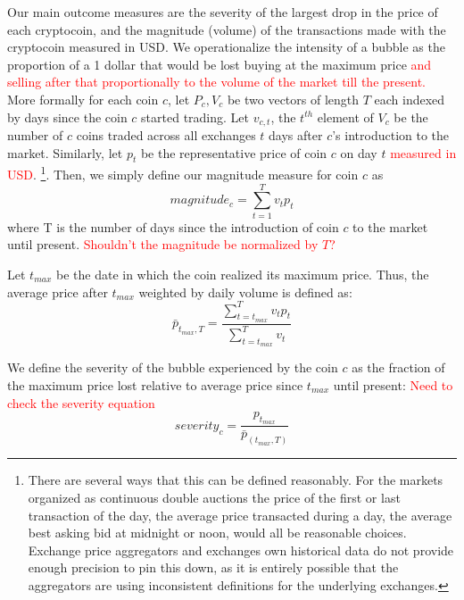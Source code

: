 Our main outcome measures are the severity of the largest drop in the price of each cryptocoin, and the magnitude (volume) of the transactions made with the cryptocoin measured in USD.
We operationalize the intensity of a bubble as the proportion of a 1 dollar that would be lost buying at the maximum price \textcolor{red}{and selling after that proportionally to the volume of the market till the present.}
More formally for each coin $c$, let $P_c,V_c$ be two vectors of length $T$ each indexed by days since the coin $c$ started trading.
Let $v_{c,t}$, the $t^{th}$ element of $V_c$ be the number of $c$ coins traded across all exchanges $t$ days after $c$'s introduction to the market. 
Similarly, let $p_t$ be the representative price of coin $c$ on day $t$ \textcolor{red}{measured in USD}. \footnote{There are several ways that this can be defined reasonably. For the markets organized as continuous double auctions the price of the first or last transaction of the day,  the average price transacted during a day, the average best asking bid at midnight or noon, would all be reasonable choices. Exchange price aggregators and exchanges own historical data do not provide enough precision to pin this down, as it is entirely possible that the aggregators are using inconsistent definitions for the underlying exchanges.}. Then, we simply define our magnitude measure for coin $c$ as
\begin{equation}
magnitude_{c} = \sum_{t=1}^{T} v_t  p_t
\end{equation}
where T is the number of days since the introduction of coin $c$ to the market until present. \textcolor{red}{Shouldn't the magnitude be normalized by $T$?}


Let $t_{max}$ be the date in which the coin realized its maximum price. Thus, the average price after $t_{max}$ weighted by daily volume is defined as:
\begin{equation}
\bar{p}_{t_{max},T} = \frac{\sum_{t=t_{max}}^{T} v_t p_t} {\sum_{t=t_{max}}^{T} v_t}
\end{equation}

We define the severity of the bubble experienced by the coin $c$ as the fraction of the maximum price lost relative to average price since $t_{max}$ until present: \textcolor{red}{Need to check the severity equation}
\begin{equation}
severity_{c} = \frac{ p_{t_{max}}} {\bar{p}_{(t_{max},T)} }
\end{equation}
